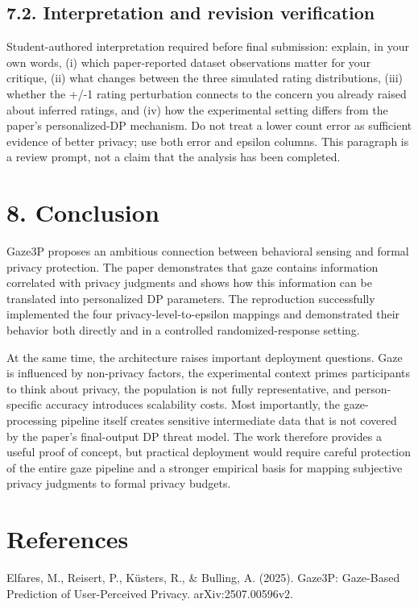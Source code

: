 \documentclass[11pt,a4paper]{article}
\begin{document}
\subsection*{7.2. Interpretation and revision verification}

Student-authored interpretation required before final submission: explain, in your own words, (i) which paper-reported dataset observations matter for your critique, (ii) what changes between the three simulated rating distributions, (iii) whether the +/-1 rating perturbation connects to the concern you already raised about inferred ratings, and (iv) how the experimental setting differs from the paper's personalized-DP mechanism. Do not treat a lower count error as sufficient evidence of better privacy; use both error and epsilon columns. This paragraph is a review prompt, not a claim that the analysis has been completed.


\section*{8. Conclusion}

Gaze3P proposes an ambitious connection between behavioral sensing and formal privacy protection. The paper demonstrates that gaze contains information correlated with privacy judgments and shows how this information can be translated into personalized DP parameters. The reproduction successfully implemented the four privacy-level-to-epsilon mappings and demonstrated their behavior both directly and in a controlled randomized-response setting.


At the same time, the architecture raises important deployment questions. Gaze is influenced by non-privacy factors, the experimental context primes participants to think about privacy, the population is not fully representative, and person-specific accuracy introduces scalability costs. Most importantly, the gaze-processing pipeline itself creates sensitive intermediate data that is not covered by the paper's final-output DP threat model. The work therefore provides a useful proof of concept, but practical deployment would require careful protection of the entire gaze pipeline and a stronger empirical basis for mapping subjective privacy judgments to formal privacy budgets.


\section*{References}

Elfares, M., Reisert, P., Küsters, R., \& Bulling, A. (2025). Gaze3P: Gaze-Based Prediction of User-Perceived Privacy. arXiv:2507.00596v2.
\end{document}
